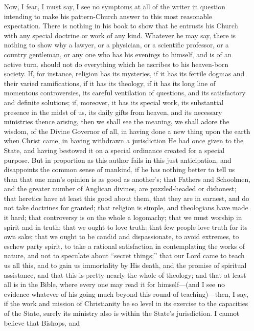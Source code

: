 Now, I fear, I must say, I see no symptoms at all of the writer in
question intending to make his pattern-Church answer to this most
reasonable expectation. There is nothing in his book to show that he
entrusts his Church with any special doctrine or work of any kind.
Whatever he may say, there is nothing to show why a lawyer, or a
physician, or a scientific professor, or a country gentleman, or any
one who has his evenings to himself, and is of an active turn, should
not do everything which he ascribes to his heaven-born society. If,
for instance, religion has its mysteries, if it has its fertile dogmas
and their varied ramifications, if it has its theology, if it has its
long line of momentous controversies, its careful ventilation of
questions, and its satisfactory and definite solutions; if, moreover,
it has its special work, its substantial presence in the midst of us,
its daily gifts from heaven, and its necessary ministries thence
arising, then we shall see the meaning, we shall adore the wisdom, of
the Divine Governor of all, in having done a new thing upon the earth
when Christ came, in having withdrawn a jurisdiction He had once given
to the State, and having bestowed it on a special ordinance created
for a special purpose. But in proportion as this author fails in this
just anticipation, and disappoints the common sense of mankind, if he
has nothing better to tell us than that one man's opinion is as good
as another's; that Fathers and Schoolmen, and the greater number of
Anglican divines, are puzzled-headed or dishonest; that heretics have
at least this good about them, that they are in earnest, and do not
take doctrines for granted; that religion is simple, and theologians
have made it hard; that controversy is on the whole a logomachy; that
we must worship in spirit and in truth; that we ought to love truth;
that few people love truth for its own sake; that we ought to be
candid and dispassionate, to avoid extremes, to eschew party spirit,
to take a rational satisfaction in contemplating the works of nature,
and not to speculate about ``secret things;'' that our Lord
came to teach us all this, and to gain us immortality by His death,
and the promise of spiritual assistance, and that this is pretty
nearly the whole of theology; and that at least all is in the Bible,
where every one may read it for himself—(and I see no evidence
whatever of his going much beyond this round of teaching)—then, I
say, if the work and mission of Christianity be so level in its
exercise to the capacities of the State, surely its ministry also is
within the State's jurisdiction. I cannot believe that Bishops, and
